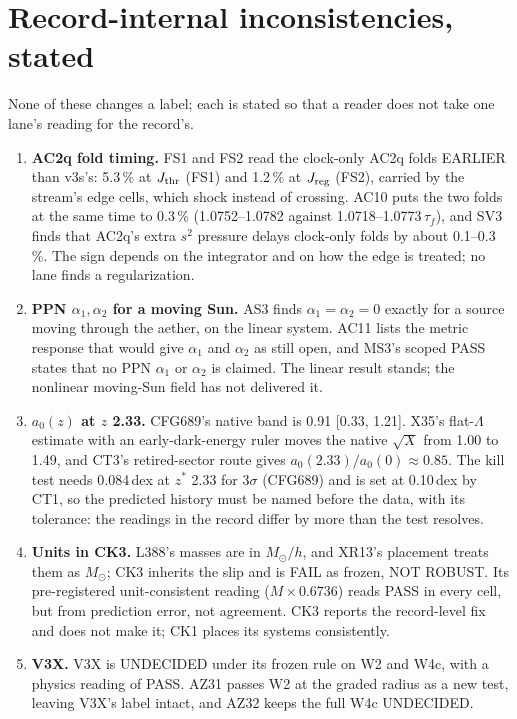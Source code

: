 \documentclass[10pt]{article}
\begin{document}
\section{Record-internal inconsistencies, stated}
None of these changes a label; each is stated so that a reader does not take one lane's reading for the record's.
\begin{enumerate}
\item \textbf{AC2q fold timing.} FS1 and FS2 read the clock-only AC2q folds EARLIER than v3s's: 5.3\,\% at $J_{\rm thr}$ (FS1) and 1.2\,\% at $J_{\rm reg}$ (FS2), carried by the stream's edge cells, which shock instead of crossing. AC10 puts the two folds at the same time to 0.3\,\% (1.0752--1.0782 against 1.0718--1.0773\,$\tau_f$), and SV3 finds that AC2q's extra $s^2$ pressure delays clock-only folds by about 0.1--0.3\,\%. The sign depends on the integrator and on how the edge is treated; no lane finds a regularization.
\item \textbf{PPN $\alpha_1,\alpha_2$ for a moving Sun.} AS3 finds $\alpha_1=\alpha_2=0$ exactly for a source moving through the aether, on the linear system. AC11 lists the metric response that would give $\alpha_1$ and $\alpha_2$ as still open, and MS3's scoped PASS states that no PPN $\alpha_1$ or $\alpha_2$ is claimed. The linear result stands; the nonlinear moving-Sun field has not delivered it.
\item \textbf{$a_0(z)$ at $z$ 2.33.} CFG689's native band is 0.91 [0.33, 1.21]. X35's flat-$\Lambda$ estimate with an early-dark-energy ruler moves the native $\sqrt X$ from 1.00 to 1.49, and CT3's retired-sector route gives $a_0(2.33)/a_0(0)\approx0.85$. The kill test needs 0.084\,dex at $z^*$ 2.33 for $3\sigma$ (CFG689) and is set at 0.10\,dex by CT1, so the predicted history must be named before the data, with its tolerance: the readings in the record differ by more than the test resolves.
\item \textbf{Units in CK3.} L388's masses are in $M_\odot/h$, and XR13's placement treats them as $M_\odot$; CK3 inherits the slip and is FAIL as frozen, NOT ROBUST. Its pre-registered unit-consistent reading ($M\times0.6736$) reads PASS in every cell, but from prediction error, not agreement. CK3 reports the record-level fix and does not make it; CK1 places its systems consistently.
\item \textbf{V3X.} V3X is UNDECIDED under its frozen rule on W2 and W4c, with a physics reading of PASS. AZ31 passes W2 at the graded radius as a new test, leaving V3X's label intact, and AZ32 keeps the full W4c UNDECIDED.

\end{enumerate}
\end{document}
